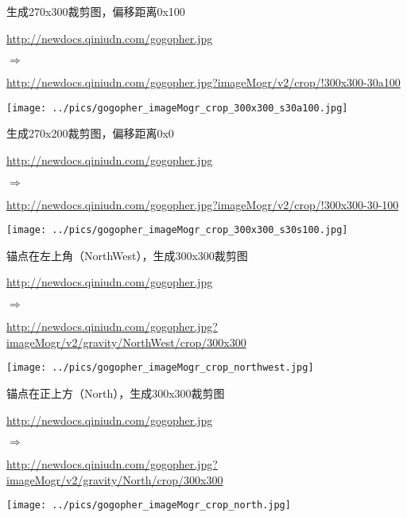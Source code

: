 \documentclass[11pt, oneside]{book}
\newcommand{\qsym}[1]{
\footnotesize
\noindent
#1\par
\normalsize
}
\newcommand{\qsamplelink}[1]{
\vspace{0.2em}
\noindent
#1\par
\vspace{0.1em}
}
\newcommand{\qurl}[1]{\footnotesize\url{#1}\normalsize}
\begin{document}
\begin{sample}
  \caption{生成270x300裁剪图，偏移距离0x100}
    \qsamplelink{\qurl{http://newdocs.qiniudn.com/gogopher.jpg}}
    \qsym{$\Rightarrow$}
    \qsamplelink{\qurl{http://newdocs.qiniudn.com/gogopher.jpg?imageMogr/v2/crop/!300x300-30a100}}

    \begin{center}
      \texttt{[image: ../pics/gogopher\_imageMogr\_crop\_300x300\_s30a100.jpg]}
    \end{center}
  \label{imageMogr-crop-300x300-s30a100}
\end{sample}

\begin{sample}
  \caption{生成270x200裁剪图，偏移距离0x0}
    \qsamplelink{\qurl{http://newdocs.qiniudn.com/gogopher.jpg}}
    \qsym{$\Rightarrow$}
    \qsamplelink{\qurl{http://newdocs.qiniudn.com/gogopher.jpg?imageMogr/v2/crop/!300x300-30-100}}

    \begin{center}
      \texttt{[image: ../pics/gogopher\_imageMogr\_crop\_300x300\_s30s100.jpg]}
    \end{center}
  \label{imageMogr-crop-300x300-s30s100}
\end{sample}

\begin{sample}
  \caption{锚点在左上角（NorthWest），生成300x300裁剪图}
    \qsamplelink{\qurl{http://newdocs.qiniudn.com/gogopher.jpg}}
    \qsym{$\Rightarrow$}
    \qsamplelink{\qurl{http://newdocs.qiniudn.com/gogopher.jpg?imageMogr/v2/gravity/NorthWest/crop/300x300}}

    \begin{center}
      \texttt{[image: ../pics/gogopher\_imageMogr\_crop\_northwest.jpg]}
    \end{center}
  \label{imageMogr-crop-northwest}
\end{sample}

\begin{sample}
  \caption{锚点在正上方（North），生成300x300裁剪图}
    \qsamplelink{\qurl{http://newdocs.qiniudn.com/gogopher.jpg}}
    \qsym{$\Rightarrow$}
    \qsamplelink{\qurl{http://newdocs.qiniudn.com/gogopher.jpg?imageMogr/v2/gravity/North/crop/300x300}}

    \begin{center}
      \texttt{[image: ../pics/gogopher\_imageMogr\_crop\_north.jpg]}
    \end{center}
  \label{imageMogr-crop-north}
\end{sample}
\end{document}
